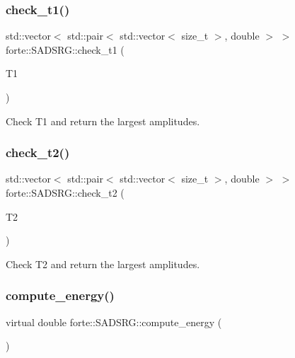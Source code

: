 \subsubsection{\texorpdfstring{check\+\_\+t1()}{check\_t1()}}
{\footnotesize\ttfamily std\+::vector$<$ std\+::pair$<$ std\+::vector$<$ size\+\_\+t $>$, double $>$ $>$ forte\+::\+S\+A\+D\+S\+R\+G\+::check\+\_\+t1 (\begin{DoxyParamCaption}\item[{Blocked\+Tensor \&}]{T1 }\end{DoxyParamCaption})\hspace{0.3cm}{\ttfamily [protected]}}



Check T1 and return the largest amplitudes. 

\mbox{\label{classforte_1_1_s_a_d_s_r_g_a013fadc5cc01c1eb8ca00b28f3ffc13a}} 
\subsubsection{\texorpdfstring{check\+\_\+t2()}{check\_t2()}}
{\footnotesize\ttfamily std\+::vector$<$ std\+::pair$<$ std\+::vector$<$ size\+\_\+t $>$, double $>$ $>$ forte\+::\+S\+A\+D\+S\+R\+G\+::check\+\_\+t2 (\begin{DoxyParamCaption}\item[{Blocked\+Tensor \&}]{T2 }\end{DoxyParamCaption})\hspace{0.3cm}{\ttfamily [protected]}}



Check T2 and return the largest amplitudes. 

\mbox{\label{classforte_1_1_s_a_d_s_r_g_aa3716848c396b296b99fff8d48751fd8}} 
\subsubsection{\texorpdfstring{compute\+\_\+energy()}{compute\_energy()}}
{\footnotesize\ttfamily virtual double forte\+::\+S\+A\+D\+S\+R\+G\+::compute\+\_\+energy (\begin{DoxyParamCaption}{ }\end{DoxyParamCaption})\hspace{0.3cm}{\ttfamily [pure virtual]}}



